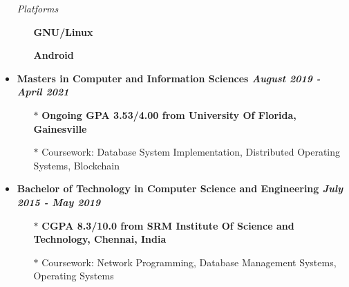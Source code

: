 \documentclass[10]{Resume}
\begin{document}
\begin{minipage}[t]{0.45\textwidth}
\begin{itemize}[noitemsep,nolistsep,leftmargin=*]
	\item[]\textit{Platforms}
			\vspace{-1em}
			\begin{multicols}{2}
			\begin{itemize}[leftmargin=*]
			\setlength\itemsep{-0.25em}
			\item[]\textbf{GNU/Linux}\hspace{5pt}
			\item[]\textbf{Android}\hspace{5pt}
			\end{itemize}
			\end{multicols}
	\end{itemize}
		
\end{minipage}


\begin{itemize}[noitemsep,nolistsep]
	\item\textbf{Masters in Computer and Information Sciences \hfill \textit{August 2019 - April 2021}}
		\begin{itemize}[leftmargin=*]
			\setlength\itemsep{-0.25em}
			\item[$\ast$]\textbf{Ongoing GPA 3.53/4.00 from University Of Florida, Gainesville}
			\item[$\ast$]{\small Coursework: Database System Implementation, Distributed Operating Systems, Blockchain}
		\end{itemize}
	\item\textbf{Bachelor of Technology in Computer Science and Engineering \hfill \textit{July 2015 - May 2019}}
		\begin{itemize}[leftmargin=*]
			\setlength\itemsep{-0.25em}
			\item[$\ast$]\textbf{CGPA 8.3/10.0 from SRM Institute Of Science and Technology, Chennai, India}
			\item[$\ast$]{\small Coursework: Network Programming, Database Management Systems, Operating Systems}
		\end{itemize}
\end{itemize}
\end{document}
